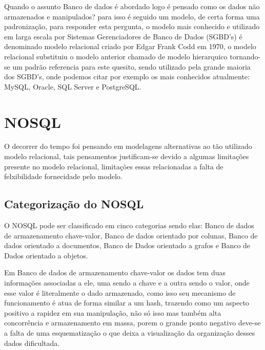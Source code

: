 \documentclass[12pt]{article}
\begin{document}
Quando o assunto Banco de dados é abordado logo é pensado como os dados não armazenados e manipulados? para isso é seguido um modelo, de certa forma uma padronização, para responder esta pergunta, o modelo mais conhecido e utilizado em larga escala por Sistemas Gerenciadores de Banco de Dados (SGBD's) é denominado modelo relacional \cite{codd:1970} criado por Edgar Frank Codd em 1970, o modelo relacional substituiu o modelo anterior chamado de modelo hierarquico tornando-se um padrão referencia para este quesito, sendo utilizado pela grande maioria dos SGBD's, onde podemos citar por exemplo os mais conhecidos atualmente: MySQL, Oracle, SQL Server e PostgreSQL. \cite{brito2010bancos}


\section{NOSQL} 
\label{sec:nosql}

O decorrer do tempo foi pensando em modelagens alternativas ao tão utilizado modelo relacional, tais pensamentos justificam-se devido a algumas limitações presente no modelo relacional, limitações essas relacionadas a falta de felxibilidade fornecidade pelo modelo.



\subsection{Categorização do NOSQL}
\label{subsec:categorizacao}

O NOSQL pode ser classificado em cinco categorias \cite{typeNOSQL:2013} sendo elas: Banco de dados de armazenamento chave-valor, Banco de dados orientado por colunas, Banco de dados orientado a documentos, Banco de Dados orientado a grafos e Banco de Dados orientado a objetos.

Em Banco de dados de armazenamento chave-valor os dados tem duas informações associadas a ele, uma sendo a chave e a outra sendo o valor, onde esse valor é literalmente o dado armazenado, como isso seu mecanismo de funcionamento é atua de forma similar a um hash, trazendo como um aspecto positivo a rapidez em sua manipulação, não só isso mas também alta concorrência e armazenamento em massa, porem o grande ponto negativo deve-se a falta de uma esquematização o que deixa a visualização da organização desses dados dificultada.
\end{document}
